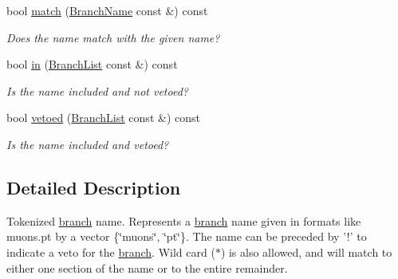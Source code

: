 \begin{DoxyCompactItemize}
bool \hyperlink{classpanda_1_1utils_1_1BranchName_ae67f0ec0a51cd28fe78c8e539aa9f95e}{match} (\hyperlink{classpanda_1_1utils_1_1BranchName}{BranchName} const \&) const 
\begin{DoxyCompactList}\small\item\em Does the name match with the given name? \item\end{DoxyCompactList}\item 
bool \hyperlink{classpanda_1_1utils_1_1BranchName_a6cc8a6df7c5b12a0221fd49773cca6a7}{in} (\hyperlink{classpanda_1_1utils_1_1BranchList}{BranchList} const \&) const 
\begin{DoxyCompactList}\small\item\em Is the name included and not vetoed? \item\end{DoxyCompactList}\item 
bool \hyperlink{classpanda_1_1utils_1_1BranchName_ae3332329bf2afae5ed8e7c35e5d77ffa}{vetoed} (\hyperlink{classpanda_1_1utils_1_1BranchList}{BranchList} const \&) const 
\begin{DoxyCompactList}\small\item\em Is the name included and vetoed? \item\end{DoxyCompactList}\end{DoxyCompactItemize}


\subsection{Detailed Description}
Tokenized \hyperlink{namespacepanda_1_1branch}{branch} name. Represents a \hyperlink{namespacepanda_1_1branch}{branch} name given in formats like muons.pt by a vector \{\char`\"{}muons\char`\"{}, \char`\"{}pt\char`\"{}\}. The name can be preceded by '!' to indicate a veto for the \hyperlink{namespacepanda_1_1branch}{branch}. Wild card ($\ast$) is also allowed, and will match to either one section of the name or to the entire remainder. 

